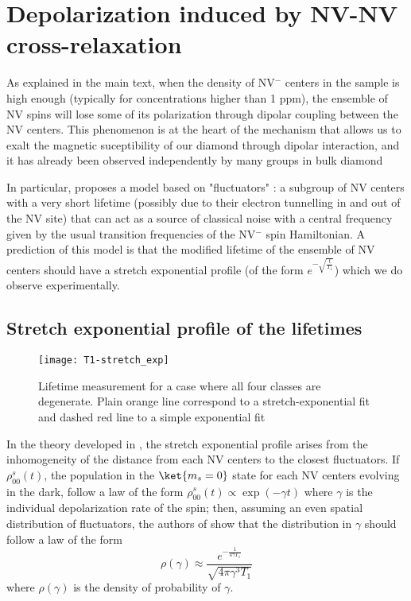 \documentclass[preprintnumbers,amsmath,amssymb,onecolumn,12pt]{revtex4}
\begin{document}
\section{Depolarization induced by NV-NV cross-relaxation}
As explained in the main text, when the density of NV$^-$ centers in the sample is high enough (typically for concentrations higher than 1 ppm), the ensemble of NV spins will lose some of its polarization through dipolar coupling between the NV centers. This phenomenon is at the heart of the mechanism that allows us to exalt the magnetic suceptibility of our diamond through dipolar interaction, and it has already been observed independently by many groups in bulk diamond \cite{Jarmola} \cite{mrozek_longitudinal_2015} \cite{choi_depolarization_2017} \cite{akhmedzhanov_microwave-free_2017} \cite{giri_coupled_2018}

In particular, \cite{choi_depolarization_2017} proposes a model based on "fluctuators" : a subgroup of NV centers with a very short lifetime (possibly due to their electron tunnelling in and out of the NV site) that can act as a source of classical noise with a central frequency given by the usual transition frequencies of the NV$^-$ spin Hamiltonian. A prediction of this model is that the modified lifetime of the ensemble of NV centers should have a stretch exponential profile (of the form $e^{-\sqrt{\frac{t}{T_1}}}$) which we do observe experimentally.

\subsection{Stretch exponential profile of the lifetimes}
\begin{figure}
\texttt{[image: T1-stretch\_exp]}
\caption{Lifetime measurement for a case where all four classes are degenerate. Plain orange line correspond to a stretch-exponential fit and dashed red line to a simple exponential fit}
	\label{stretch}
\end{figure}
In the theory developed in \cite{choi_depolarization_2017}, the stretch exponential profile arises from the inhomogeneity of the distance from each NV centers to the closest fluctuators. If $\rho_{00}^s(t)$, the population in the $\ket{m_s=0}$ state for each NV centers evolving in the dark, follow a law of the form $\rho_{00}^s(t) \propto \exp(-\gamma t)$ where $\gamma$ is the individual depolarization rate of the spin; then, assuming an even spatial distribution of fluctuators, the authors of \cite{choi_depolarization_2017} show that the distribution in $\gamma$ should follow a law of the form $$\rho(\gamma) \approx \frac{e^{-\frac{1}{4 \gamma T_1}}}{\sqrt{4 \pi \gamma^3 T_1}} $$ where $\rho(\gamma)$ is the density of probability of $\gamma$.
\end{document}
